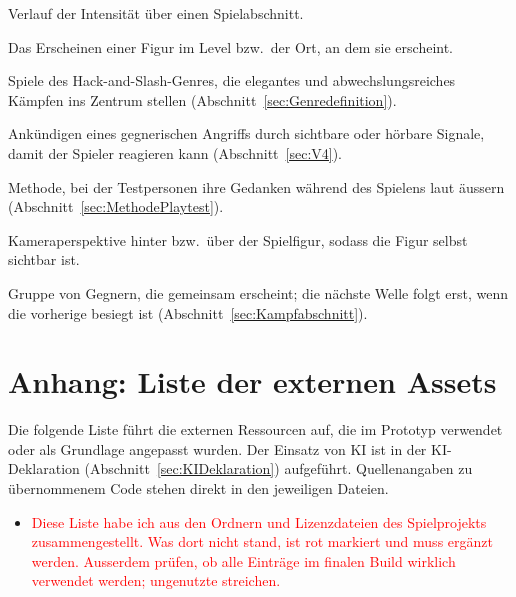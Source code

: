 \documentclass[../Main.tex]{subfiles}
\begin{document}
\begin{description}[style=unboxed, leftmargin=0cm, itemsep=0.3em]
    \item[Spannungskurve] Verlauf der Intensität über einen Spielabschnitt.
    \item[Spawn, Spawnpunkt] Das Erscheinen einer Figur im Level bzw.\ der Ort, an dem sie erscheint.
    \item[Stylish-Action] Spiele des Hack-and-Slash-Genres, die elegantes und abwechslungsreiches Kämpfen ins Zentrum stellen (Abschnitt~\ref{sec:Genredefinition}).
    \item[Telegrafieren] Ankündigen eines gegnerischen Angriffs durch sichtbare oder hörbare Signale, damit der Spieler reagieren kann (Abschnitt~\ref{sec:V4}).
    \item[Think-aloud] Methode, bei der Testpersonen ihre Gedanken während des Spielens laut äussern (Abschnitt~\ref{sec:MethodePlaytest}).
    \item[Third-Person-Perspektive] Kameraperspektive hinter bzw.\ über der Spielfigur, sodass die Figur selbst sichtbar ist.
    \item[Welle] Gruppe von Gegnern, die gemeinsam erscheint; die nächste Welle folgt erst, wenn die vorherige besiegt ist (Abschnitt~\ref{sec:Kampfabschnitt}).
\end{description}

\newpage
\section{Anhang: Liste der externen Assets} \label{sec:Assets}

Die folgende Liste führt die externen Ressourcen auf, die im Prototyp verwendet oder als Grundlage angepasst wurden. Der Einsatz von KI ist in der KI-Deklaration (Abschnitt~\ref{sec:KIDeklaration}) aufgeführt. Quellenangaben zu übernommenem Code stehen direkt in den jeweiligen Dateien.

\begin{itemize}[leftmargin=1.5cm]
    \item \textcolor{red}{Diese Liste habe ich aus den Ordnern und Lizenzdateien des Spielprojekts zusammengestellt. Was dort nicht stand, ist rot markiert und muss ergänzt werden. Ausserdem prüfen, ob alle Einträge im finalen Build wirklich verwendet werden; ungenutzte streichen.}
\end{itemize}
\end{document}
